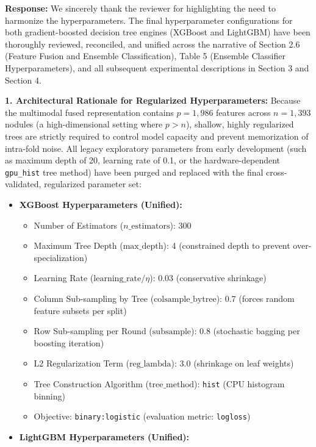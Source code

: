 \documentclass[11pt,a4paper]{article}
\newenvironment{authorresponse}{\par\begingroup\color{authorblue}}{\endgroup\par}
\begin{document}
\begin{authorresponse}
\textbf{Response:}
We sincerely thank the reviewer for highlighting the need to harmonize the hyperparameters. The final hyperparameter configurations for both gradient-boosted decision tree engines (XGBoost and LightGBM) have been thoroughly reviewed, reconciled, and unified across the narrative of Section 2.6 (Feature Fusion and Ensemble Classification), Table 5 (Ensemble Classifier Hyperparameters), and all subsequent experimental descriptions in Section 3 and Section 4.

\textbf{1. Architectural Rationale for Regularized Hyperparameters:}
Because the multimodal fused representation contains $p = 1{,}986$ features across $n = 1{,}393$ nodules (a high-dimensional setting where $p > n$), shallow, highly regularized trees are strictly required to control model capacity and prevent memorization of intra-fold noise. All legacy exploratory parameters from early development (such as maximum depth of 20, learning rate of 0.1, or the hardware-dependent \texttt{gpu\_hist} tree method) have been purged and replaced with the final cross-validated, regularized parameter set:
\begin{itemize}[leftmargin=2em]
  \item \textbf{XGBoost Hyperparameters (Unified):}
  \begin{itemize}
    \item Number of Estimators ($n\_\mathrm{estimators}$): 300
    \item Maximum Tree Depth ($\mathrm{max\_depth}$): 4 (constrained depth to prevent over-specialization)
    \item Learning Rate ($\mathrm{learning\_rate} / \eta$): 0.03 (conservative shrinkage)
    \item Column Sub-sampling by Tree ($\mathrm{colsample\_bytree}$): 0.7 (forces random feature subsets per split)
    \item Row Sub-sampling per Round ($\mathrm{subsample}$): 0.8 (stochastic bagging per boosting iteration)
    \item L2 Regularization Term ($\mathrm{reg\_lambda}$): 3.0 (shrinkage on leaf weights)
    \item Tree Construction Algorithm ($\mathrm{tree\_method}$): \texttt{hist} (CPU histogram binning)
    \item Objective: \texttt{binary:logistic} (evaluation metric: \texttt{logloss})
  \end{itemize}
  \item \textbf{LightGBM Hyperparameters (Unified):}

\end{itemize}
\end{authorresponse}
\end{document}

